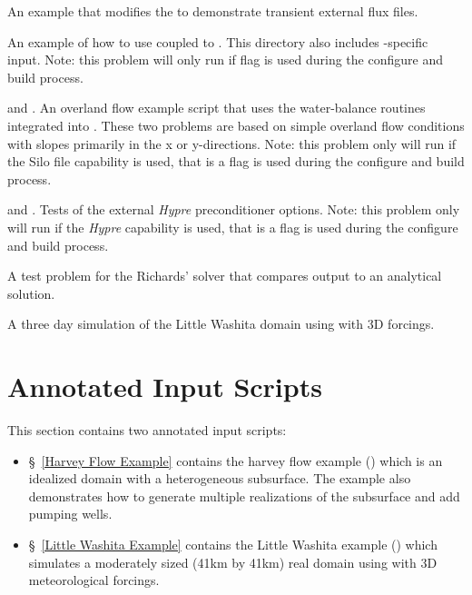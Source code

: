 \begin{description}
\item{ An example that modifies the  to demonstrate transient external flux  files.}

\item{ An example of how to use \parflow{} coupled to {}.  This directory also includes {}-specific input. Note: this problem will only run if {} flag is used during the configure and build process.}

\item{ and {}. An overland flow example script that uses the water-balance routines integrated into {}.  These two problems are based on simple overland flow conditions with slopes primarily in the x or y-directions.  Note: this problem only will run if the Silo file capability is used, that is a {} flag is used during the configure and build process.}

\item{ and . Tests of the external \emph{Hypre} preconditioner options.  Note: this problem only will run if the \emph{Hypre} capability is used, that is a {} flag is used during the configure and build process.}

\item{ A test problem for the Richards' solver that compares output to an analytical solution.}

\item{ A three day simulation of the Little Washita domain using \parflow{}  with 3D forcings. }

\end{description}


\section{Annotated Input Scripts}
\label{Tutorial}

This section contains two annotated input scripts:

\begin{itemize}
	\item \S~\ref{Harvey Flow Example} contains the harvey flow example ()
	which is an idealized domain with a heterogeneous subsurface. The example also demonstrates how to generate 
	multiple realizations of the subsurface and add pumping wells. 
	 
	\item \S~\ref{Little Washita Example} contains the Little Washita example ()
	which simulates a moderately sized (41km by 41km) real domain using \parflow{} 
	with 3D meteorological forcings.
	 
\end{itemize}

